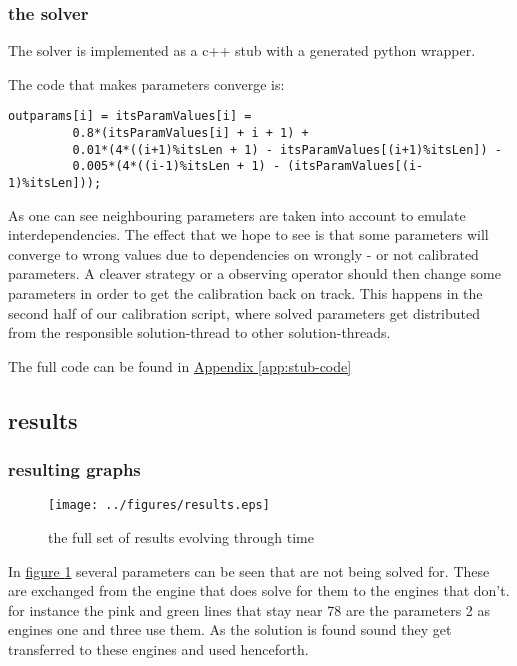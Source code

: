 \documentclass[]{lofar}
\begin{document}
      \subsubsection{the solver}
      \label{subsubsec:solver}
        The solver is implemented as a c++ stub with a generated
        python wrapper.

        The code that makes parameters converge is:

\begin{Verbatim}[]
      outparams[i] = itsParamValues[i] =
         0.8*(itsParamValues[i] + i + 1) +
         0.01*(4*((i+1)%itsLen + 1) - itsParamValues[(i+1)%itsLen]) -
         0.005*(4*((i-1)%itsLen + 1) - (itsParamValues[(i-1)%itsLen]));
\end{Verbatim}

        As one can see neighbouring parameters are taken into account to
        emulate interdependencies. The effect that we hope to see is
        that some parameters will converge to wrong values due to
        dependencies on wrongly - or not calibrated parameters. A
        cleaver strategy or a observing operator should then change
        some parameters in order to get the calibration back on
        track. This happens in the second half of our calibration
        script, where solved parameters get distributed from the
        responsible solution-thread to other solution-threads.

        The full code can be found in \hyperlink{stub-code}{Appendix
        {\ref*{app:stub-code}}}

    \subsection{results}
    \label{subsec:results}

      \subsubsection{resulting graphs}
      \label{subsubsec:resulting-graphs}

      \begin{figure}
        \texttt{[image: ../figures/results.eps]}
        \hypertarget{fig:results}{}
        \caption{the full set of results evolving through time\label{fig:results}}
      \end{figure}

      In \hyperlink{fig:results}{figure \ref{fig:results}} several parameters
      can be seen that are not being solved for. These are exchanged
      from the engine that does solve for them to the engines that
      don't. for instance the pink and green lines that stay near 78
      are the parameters 2 as engines one and three use them. As the
      solution is found sound they get transferred to these engines
      and used henceforth.
\end{document}
